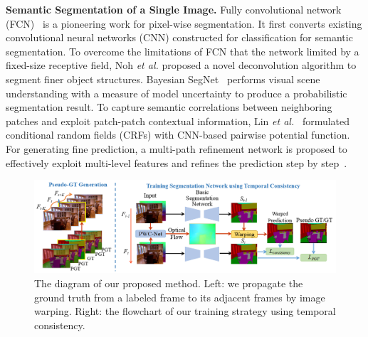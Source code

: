 \noindent \textbf{Semantic Segmentation of a Single Image.}
%
Fully convolutional network (FCN)~\cite{Long2015} is a pioneering work for pixel-wise segmentation. It first converts existing convolutional neural networks (CNN) constructed for classification for semantic segmentation.
%
To overcome the limitations of FCN that the network limited by a fixed-size receptive field, Noh \emph{et al.} \cite{Noh2015} proposed a novel deconvolution algorithm to segment finer object structures.
%
Bayesian SegNet~\cite{Kendall2015} performs visual scene understanding with a measure of model uncertainty to produce a probabilistic segmentation result.
%
To capture semantic correlations between neighboring patches and exploit patch-patch contextual information, Lin \emph{et al.}~\cite{Lin2016} formulated conditional random fields (CRFs) with CNN-based pairwise potential function. 
%
For generating fine prediction, a multi-path refinement network is proposed to effectively exploit multi-level features and refines the prediction step by step~\cite{Lin2017}.
%


\begin{figure}[htbp]
	\setlength{\abovecaptionskip}{0pt} 
	\setlength{\belowcaptionskip}{10pt}
	\centering
	\centering
	\includegraphics[scale=0.56]{figure/Pipeline.png}
	\caption{The diagram of our proposed method. Left: we propagate the ground truth from a labeled frame to its adjacent frames by image warping. Right: the flowchart of our training strategy using temporal consistency. 
		}
	\label{fig:Pipeline}
	\vspace*{-0.2cm}
\end{figure}
 

